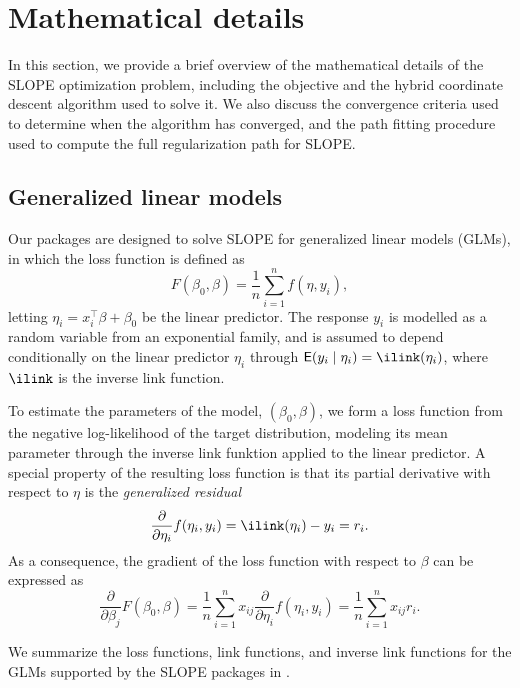 \documentclass[article]{jss}
\let\Cref\crtCref
\begin{document}
\section{Mathematical details}\label{sec:math-details}

In this section, we provide a brief overview of the mathematical
details of the SLOPE optimization problem, including the objective and
the hybrid coordinate descent algorithm used to solve it. We also discuss the
convergence criteria used to determine when the algorithm has converged, and
the path fitting procedure used to compute the full regularization path for SLOPE.

\subsection{Generalized linear models}
\label{sec:glm}

Our packages are designed to solve SLOPE for generalized linear models (GLMs),
in which the loss function is defined as
\[
  F(\beta_0, \beta) = \frac{1}{n} \sum_{i=1}^n f(\eta, y_i),
\]
letting \(\eta_i = x_i^\intercal \beta + \beta_0\) be the linear predictor. The
response \(y_i\) is modelled as a random variable from an exponential family,
and is assumed to depend conditionally on the linear predictor \(\eta_i\)
through \(\E(y_i \mid \eta_i) = \ilink(\eta_i)\), where \(\ilink\) is the
inverse link function.

To estimate the parameters of the model, \((\beta_0, \beta)\), we form a loss
function from the negative log-likelihood of the target distribution, modeling
its mean parameter through the inverse link funktion applied to the linear
predictor. A special property of the resulting loss function is that its partial
derivative with respect to \(\eta\) is the
\emph{generalized residual}
\[
  \frac{\partial}{\partial \eta_i} f(\eta_i, y_i) = \ilink(\eta_i) - y_i = r_i.
\]
As a consequence, the gradient of the loss function with respect to \(\beta\)
can be expressed as
\[
  \frac{\partial}{\partial \beta_j} F(\beta_0,\beta)
  = \frac{1}{n} \sum_{i=1}^n x_{ij} \frac{\partial}{\partial \eta_i} f(\eta_i, y_i)
  = \frac{1}{n} \sum_{i=1}^n x_{ij} r_i.
\]

We summarize the loss functions, link functions, and inverse link functions
for the GLMs supported by the SLOPE packages in \Cref{tab:glm}.
\end{document}

